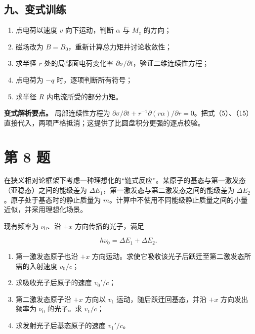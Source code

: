 \documentclass[12pt,a4paper,UTF8]{ctexart}
\newcommand{\tightlist}{\setlength{\itemsep}{0pt}\setlength{\parskip}{0pt}}
\begin{document}
\subsection{九、变式训练}\label{ux4e5dux53d8ux5f0fux8badux7ec3-6}

\begin{enumerate}
\def\labelenumi{\arabic{enumi}.}
\tightlist
\item
  点电荷以速度 \(v\) 向下运动，判断 \(\alpha\) 与 \(M_z\) 的方向；
\item
  磁场改为 \(B=B_0\)，重新计算总力矩并讨论收敛性；
\item
  求半径 \(r\) 处的局部面电荷变化率
  \(\partial\sigma/\partial t\)，验证二维连续性方程；
\item
  点电荷为 \(-q\) 时，逐项判断所有符号；
\item
  求半径 \(R\) 内电流所受的部分力矩。
\end{enumerate}

\textbf{变式解析要点。} 局部连续性方程为
\(\partial\sigma/\partial t+r^{-1}\partial(r\alpha)/\partial r=0\)。把式（5）、（15）直接代入，两项严格抵消；这提供了比圆盘积分更强的逐点校验。

\newpage

\section{第 8 题}\label{ux7b2c-8-ux9898}

在狭义相对论框架下考虑一种理想化的``链式反应''。某原子的基态与第一激发态（亚稳态）之间的能级差为
\(\Delta E_1\)，第一激发态与第二激发态之间的能级差为
\(\Delta E_2\)。原子处于基态时的静止质量为
\(m\)。计算中不使用不同能级静止质量之间的小量近似，并采用理想化场景。

现有频率为 \(\nu_0\)、沿 \(+x\) 方向传播的光子，满足

\[
h\nu_0=\Delta E_1+\Delta E_2.
\]

\begin{enumerate}
\def\labelenumi{\arabic{enumi}.}
\tightlist
\item
  第一激发态原子也沿 \(+x\)
  方向运动。求使它吸收该光子后跃迁至第二激发态所需的入射速度 \(v_0/c\)；
\item
  求吸收光子后原子的速度 \(v_0'/c\)；
\item
  第二激发态原子沿 \(+x\) 方向以 \(v_1\) 运动，随后跃迁回基态，并沿
  \(+x\) 方向发出频率为 \(\nu_0\) 的光子。求 \(v_1/c\)；
\item
  求发射光子后基态原子的速度 \(v_1'/c\)。
\end{enumerate}
\end{document}
